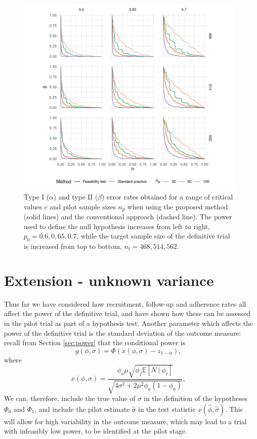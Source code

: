 \documentclass[AMA,STIX1COL]{WileyNJD-v2}
\begin{document}
\begin{figure}
\centering
\includegraphics[scale=0.8, trim={1.5cm 0 0 0},clip]{./Figures/eval.pdf}
\caption{Type I ($\alpha$) and type II ($\beta$) error rates obtained for a range of critical values $c$ and pilot sample sizes $n_p$ when using the proposed method (solid lines) and the conventional approach (dashed line). The power used to define the null hypothesis increases from left to right, $p_0 = 0.6, 0,65, 0.7$, while the target sample size of the definitive trial is increased from top to bottom, $n_t = 468, 514, 562$.}
\label{fig:eval}
\end{figure}

\section{Extension - unknown variance}\label{sec:extension}

Thus far we have considered how recruitment, follow-up and adherence rates all affect the power of the definitive trial, and have shown how these can be assessed in the pilot trial as part of a hypothesis test. Another parameter which affects the power of the definitive trial is the standard deviation of the outcome measure: recall from Section \ref{sec:power} that the conditional power is 
$$
g(\phi, \sigma) = \Phi \left( x(\phi, \sigma) - z_{1-\alpha} \right),
$$
where
$$
x(\phi, \sigma) =  \frac{ \phi_a\mu \sqrt{\phi_f \mathbb{E}[N ~|~ \phi_r]} } {\sqrt{4\sigma^2 + 2 \mu^2 \phi_a(1-\phi_a)}},
$$
We can, therefore, include the true value of $\sigma$ in the definition of the hypotheses $\Phi_0$ and $\Phi_1$, and include the pilot estimate $\hat{\sigma}$ in the test statistic $x(\hat{\phi}, \hat{\sigma})$. This will allow for high variability in the outcome measure, which may lead to a trial with infeasibly low power, to be identified at the pilot stage.
\end{document}
